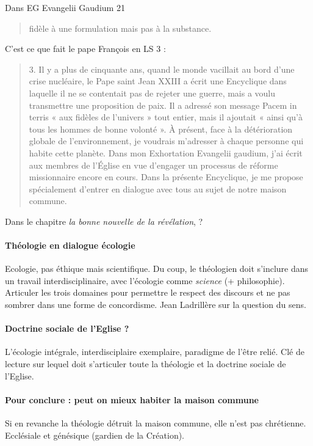 Dans EG Evangelii Gaudium 21 
\begin{quote}
    fidèle à une formulation mais pas à la substance.
\end{quote}
C'est ce que fait le pape François en LS 3 : 
\begin{quote}
    3. Il y a plus de cinquante ans, quand le monde vacillait au bord d’une crise nucléaire, le Pape saint Jean XXIII a écrit une Encyclique dans laquelle il ne se contentait pas de rejeter une guerre, mais a voulu transmettre une proposition de paix. Il a adressé son message Pacem in terris « aux fidèles de l’univers » tout entier, mais il ajoutait « ainsi qu’à tous les hommes de bonne volonté ». À présent, face à la détérioration globale de l’environnement, je voudrais m’adresser à chaque personne qui habite cette planète. Dans mon Exhortation Evangelii gaudium, j’ai écrit aux membres de l’Église en vue d'engager un processus de réforme missionnaire encore en cours. Dans la présente Encyclique, je me propose spécialement d’entrer en dialogue avec tous au sujet de notre maison commune.
\end{quote}

Dans le chapitre \textit{la bonne nouvelle de la révélation}, ?


\paragraph{Théologie en dialogue écologie} Ecologie, pas éthique mais scientifique. Du coup, le théologien doit s'inclure dans un travail interdisciplinaire, avec l'écologie comme \textit{science} (+ philosophie). 
Articuler les trois domaines pour permettre le respect des discours et ne pas sombrer dans une forme de concordisme. Jean Ladrillère sur la question du sens.

\paragraph{Doctrine sociale de l'Eglise ?} L'écologie intégrale, interdisciplaire exemplaire, paradigme de l'être relié. Clé de lecture sur lequel doit s'articuler toute la théologie et la doctrine sociale de l'Eglise. 

\paragraph{Pour conclure : peut on mieux habiter la maison commune} Si en revanche la théologie détruit la maison commune, elle n'est pas chrétienne.  Ecclésiale  et génésique (gardien de la Création).

